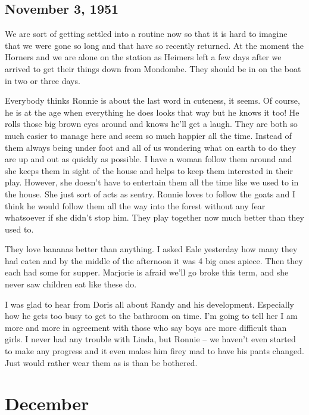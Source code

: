 \documentclass[
]{book}
\begin{document}
\hypertarget{november-3-1951}{%
\subsection{November 3, 1951}\label{november-3-1951}}

We are sort of getting settled into a routine now so that it is hard to imagine that we were gone so long and that have so recently returned. At the moment the Horners and we are alone on the station as Heimers left a few days after we arrived to get their things down from Mondombe. They should be in on the boat in two or three days.

Everybody thinks Ronnie is about the last word in cuteness, it seems. Of course, he is at the age when everything he does looks that way but he knows it too! He rolls those big brown eyes around and knows he'll get a laugh. They are both so much easier to manage here and seem so much happier all the time. Instead of them always being under foot and all of us wondering what on earth to do they are up and out as quickly as possible. I have a woman follow them around and she keeps them in sight of the house and helps to keep them interested in their play. However, she doesn't have to entertain them all the time like we used to in the house. She just sort of acts as sentry. Ronnie loves to follow the goats and I think he would follow them all the way into the forest without any fear whatsoever if she didn't stop him. They play together now much better than they used to.

They love bananas better than anything. I asked Eale yesterday how many they had eaten and by the middle of the afternoon it was 4 big ones apiece. Then they each had some for supper. Marjorie is afraid we'll go broke this term, and she never saw children eat like these do.

I was glad to hear from Doris all about Randy and his development. Especially how he gets too busy to get to the bathroom on time. I'm going to tell her I am more and more in agreement with those who say boys are more difficult than girls. I never had any trouble with Linda, but Ronnie -- we haven't even started to make any progress and it even makes him firey mad to have his pants changed. Just would rather wear them as is than be bothered.

\hypertarget{december-1}{%
\section{December}\label{december-1}}
\end{document}
